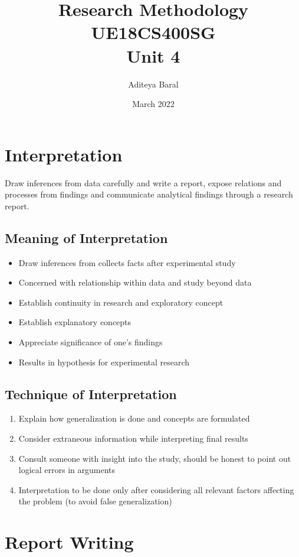 \documentclass{article}
\title{Research Methodology UE18CS400SG \\ Unit 4}
\author{Aditeya Baral}
\date{March 2022}
\begin{document}
\maketitle

\section{Interpretation}

Draw inferences from data carefully and write a report, expose relations and processes from findings and communicate analytical findings through a research report.

\subsection{Meaning of Interpretation}

\begin{itemize}
    \item Draw inferences from collects facts after experimental study
    \item Concerned with relationship within data and study beyond data
    \item Establish continuity in research and exploratory concept
    \item Establish explanatory concepts
    \item Appreciate significance of one's findings
    \item Results in hypothesis for experimental research
\end{itemize}

\subsection{Technique of Interpretation}

\begin{enumerate}
    \item Explain how generalization is done and concepts are formulated
    \item Consider extraneous information while interpreting final results
    \item Consult someone with insight into the study, should be honest to point out logical errors in arguments
    \item Interpretation to be done only after considering all relevant factors affecting the problem (to avoid false generalization)
\end{enumerate}

\section{Report Writing}
\end{document}
